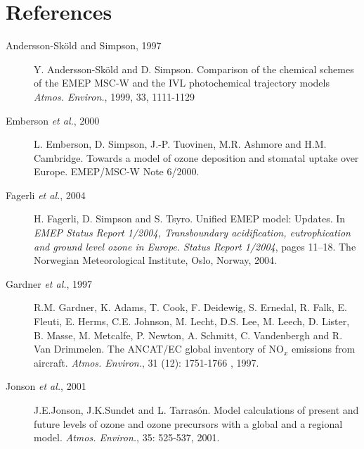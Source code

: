 \chapter*{References}
\label{ch:References}

\begin{description}

\item[Andersson-Sk{\"o}ld and Simpson, 1997] Y. Andersson-Sk\"{o}ld
  and D. Simpson. 
Comparison of the chemical schemes of 
the EMEP MSC-W and the IVL photochemical trajectory models {\it Atmos. 
Environ.}, 1999, 33, 1111-1129

\item[Emberson {\sl et al.}, 2000] L. Emberson, D. Simpson,
  J.-P. Tuovinen, M.R. Ashmore and H.M. Cambridge. Towards a model of
  ozone deposition and stomatal uptake over Europe. EMEP/MSC-W
  Note 6/2000.

\item[Fagerli {\sl et al.}, 2004] H. Fagerli, D. Simpson and
  S. Tsyro.
 Unified EMEP model: Updates. In {\it EMEP Status Report
    1/2004, Transboundary acidification, eutrophication and ground
    level ozone in Europe. Status Report 1/2004}, pages 11--18. The Norwegian
Meteorological Institute, Oslo, Norway, 2004.

\item[Gardner {\sl et al.}, 1997] R.M. Gardner, K. Adams, T. Cook,
  F. Deidewig, S. Ernedal, R. Falk, E. Fleuti, E. Herms, C.E. Johnson,
  M. Lecht, D.S. Lee, M. Leech, D. Lister, B. Masse, M. Metcalfe,
  P. Newton, A. Schmitt, C. Vandenbergh and R. Van Drimmelen. The
  ANCAT/EC global inventory of NO$_x$ emissions from 
		  aircraft. {\it Atmos. Environ.}, 31 (12): 1751-1766
, 1997.


\item[Jonson {\sl et al.}, 2001] J.E.Jonson, J.K.Sundet and
  L. Tarras{\'o}n. Model calculations of present and future levels of
ozone and ozone precursors with a global and a regional model. {\it
  Atmos. Environ.}, 35: 525-537, 2001.  



\end{description}
